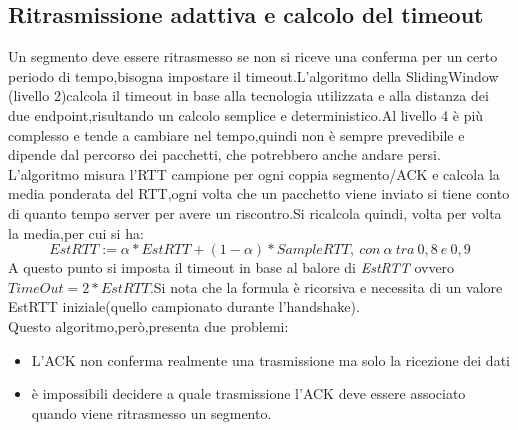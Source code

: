 \subsection{Ritrasmissione adattiva e calcolo del timeout}
Un segmento deve essere ritrasmesso se non si riceve una conferma per un certo periodo di tempo,bisogna impostare il timeout.L'algoritmo della SlidingWindow (livello 2)calcola il timeout in base alla tecnologia utilizzata e alla distanza dei due endpoint,risultando un calcolo semplice e deterministico.Al livello 4 è più complesso e tende a cambiare nel tempo,quindi non è sempre prevedibile e dipende dal percorso dei pacchetti, che potrebbero anche andare persi. \\
L'algoritmo misura l'RTT campione per ogni coppia segmento/ACK e calcola la media ponderata del RTT,ogni volta che un pacchetto viene inviato si tiene conto di quanto tempo server per avere un riscontro.Si ricalcola quindi, volta per volta la media,per cui si ha:
\begin{equation}
  EstRTT := \alpha * EstRTT + (1 - \alpha) * SampleRTT,\: con\: \alpha \: tra \: 0,8 \: e \: 0,9
\end{equation}
A questo punto si imposta il timeout in base al balore di \textit{EstRTT} ovvero $TimeOut = 2 * EstRTT$.Si nota che la formula è ricorsiva e necessita di un valore EstRTT iniziale(quello campionato durante l'handshake).\\
Questo algoritmo,però,presenta due problemi:
\begin{itemize}
  \item L'ACK non conferma realmente una trasmissione ma solo la ricezione dei dati
  \item è impossibili decidere a quale trasmissione l'ACK deve essere associato quando viene ritrasmesso un segmento.
\end{itemize}
